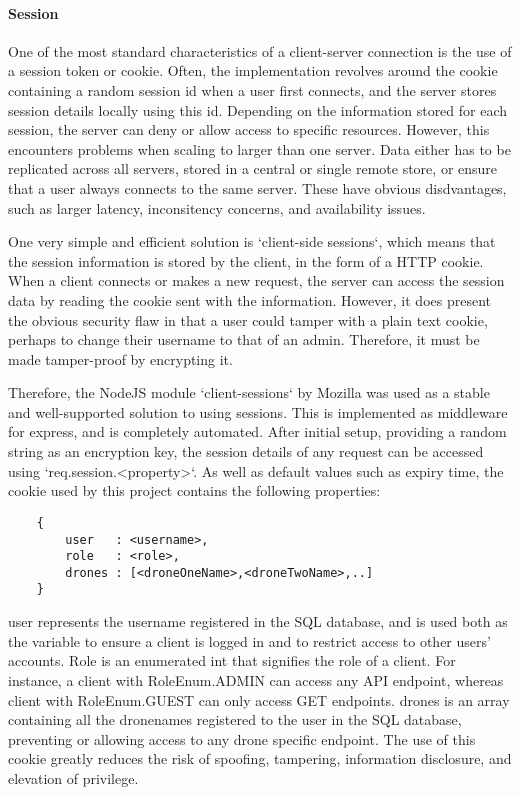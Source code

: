 \documentclass{article}
\begin{document}
\paragraph{Session}
One of the most standard characteristics of a client-server connection is the use of a session token or cookie. Often, the implementation revolves around the cookie containing a random session id when a user first connects, and the server stores session details locally using this id.  Depending on the information stored for each session, the server can deny or allow access to specific resources. However, this encounters problems when scaling to larger than one server. Data either has to be replicated across all servers, stored in a central or single remote store, or ensure that a user always connects to the same server\cite{mozillaClientSessions}. These have obvious disdvantages, such as larger latency, inconsitency concerns, and availability issues. 

One very simple and efficient solution is `client-side sessions`, which means that the session information is stored by the client, in the form of a HTTP cookie. When a client connects or makes a new request, the server can access the session data by reading the cookie sent with the information. However, it does present the obvious security flaw in that a user could tamper with a plain text cookie, perhaps to change their username to that of an admin. Therefore, it must be made tamper-proof by encrypting it\cite{mozillaClientSessions}. 

Therefore, the NodeJS module `client-sessions` by Mozilla was used as a stable and well-supported solution to using sessions\cite{client-sessions}. This is implemented as middleware for express, and is completely automated. After initial setup, providing a random string as an encryption key, the session details of any request can be accessed using `req.session.\textless property\textgreater`. As well as default values such as expiry time, the cookie used by this project contains the following properties:
\begin{center}
\begin{lstlisting}
	{
		user   : <username>,
		role   : <role>,
		drones : [<droneOneName>,<droneTwoName>,..]
	}
\end{lstlisting}
\end{center}
user represents the username registered in the SQL database, and is used both as the variable to ensure a client is logged in and to restrict access to other users' accounts. Role is an enumerated int that signifies the role of a client. For instance, a client with RoleEnum.ADMIN can access any API endpoint, whereas client with RoleEnum.GUEST can only access GET endpoints. drones is an array containing all the dronenames registered to the user in the SQL database, preventing or allowing access to any drone specific endpoint. The use of this cookie greatly reduces the risk of spoofing, tampering, information disclosure, and elevation of privilege. 
\end{document}

